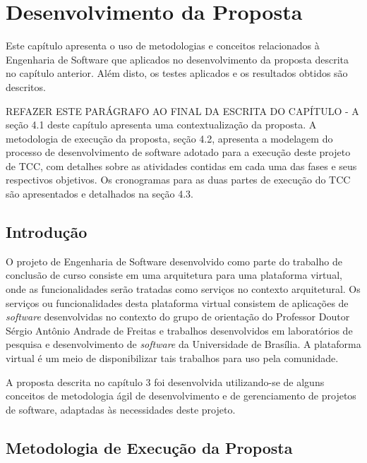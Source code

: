 \chapter[Desenvolvimento da Proposta]{Desenvolvimento da Proposta}

Este capítulo apresenta o uso de metodologias e conceitos relacionados à Engenharia de Software que aplicados no desenvolvimento da proposta descrita no capítulo anterior. Além disto, os testes aplicados e os resultados obtidos são descritos.

REFAZER ESTE PARÁGRAFO AO FINAL DA ESCRITA DO CAPÍTULO - A seção 4.1 deste capítulo apresenta uma contextualização da proposta. A metodologia de execução da proposta, seção 4.2, apresenta a modelagem do processo de desenvolvimento de software adotado para a execução deste projeto de TCC, com detalhes sobre as atividades contidas em cada uma das fases e seus respectivos objetivos. Os cronogramas para as duas partes de execução do TCC são apresentados e detalhados na seção 4.3.

\section{Introdução}
O projeto de Engenharia de Software desenvolvido como parte do trabalho de conclusão de curso consiste em uma arquitetura para uma plataforma virtual, onde as funcionalidades serão tratadas como serviços no contexto arquitetural. Os serviços ou funcionalidades desta plataforma virtual consistem de aplicações de \textit{software} desenvolvidas no contexto do grupo de orientação do Professor Doutor Sérgio Antônio Andrade de Freitas e trabalhos desenvolvidos em laboratórios de pesquisa e desenvolvimento de \textit{software} da Universidade de Brasília. A plataforma virtual é um meio de disponibilizar tais trabalhos para uso pela comunidade.

A proposta descrita no capítulo 3 foi desenvolvida utilizando-se de alguns conceitos de metodologia ágil de desenvolvimento e de gerenciamento de projetos de software, adaptadas às necessidades deste projeto.

\section{Metodologia de Execução da Proposta}

